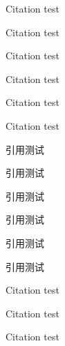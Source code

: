 \documentclass[UTF8,scheme=plain,fontset=fandol]{ctexart}
\begin{document}
\START
\showoutput

Citation \citet{jon88} test\par
Citation \citet[42]{jon88} test\par
Citation \citep{jon89} test\par
Citation \citep[42]{jon89} test\par
Citation \citep[see][]{jon90} test\par
Citation \citep[see][42]{jon90} test\par

引用\citet{lzp1}测试\par
引用\citet[42]{lzp1}测试\par
引用\citep{lzp2}测试\par
引用\citep[42]{lzp2}测试\par
引用\citep[见][]{lzp3}测试\par
引用\citep[见][42]{lzp3}测试\par

Citation \citep{jon88} test\par
Citation \citep{jon89,jon90} test\par
Citation \citep{lzp1,lzp2,lzp3} test\par

\clearpage
\OMIT


\end{document}
